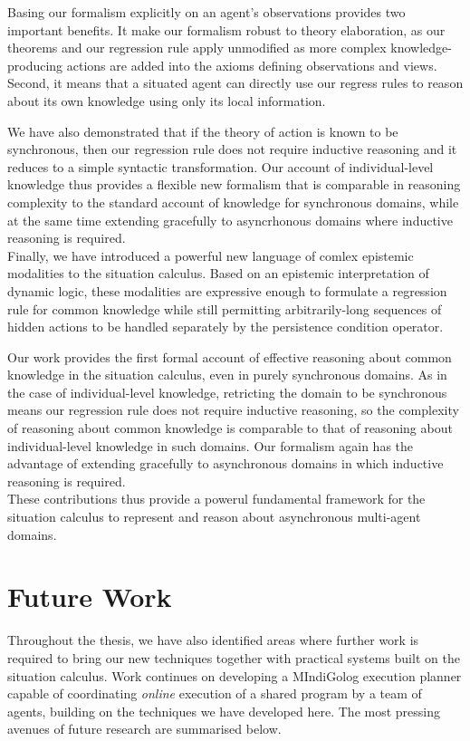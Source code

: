 Basing our formalism explicitly on an agent's observations provides
two important benefits. It make our formalism robust to theory elaboration,
as our theorems and our regression rule apply unmodified as more complex
knowledge-producing actions are added into the axioms defining observations
and views. Second, it means that a situated agent can directly use
our regress rules to reason about its own knowledge using only its
local information.

We have also demonstrated that if the theory of action is known to
be synchronous, then our regression rule does not require inductive
reasoning and it reduces to a simple syntactic transformation. Our
account of individual-level knowledge thus provides a flexible new
formalism that is comparable in reasoning complexity to the standard
account of knowledge for synchronous domains, while at the same time
extending gracefully to asyncrhonous domains where inductive reasoning
is required.\\


Finally, we have introduced a powerful new language of comlex epistemic
modalities to the situation calculus. Based on an epistemic interpretation
of dynamic logic, these modalities are expressive enough to formulate
a regression rule for common knowledge while still permitting arbitrarily-long
sequences of hidden actions to be handled separately by the persistence
condition operator.

Our work provides the first formal account of effective reasoning
about common knowledge in the situation calculus, even in  purely
synchronous domains. As in the case of individual-level knowledge,
retricting the domain to be synchronous means our regression rule
does not require inductive reasoning, so the complexity of reasoning
about common knowledge is comparable to that of reasoning about individual-level
knowledge in such domains. Our formalism again has the advantage of
extending gracefully to asynchronous domains in which inductive reasoning
is required.\\


These contributions thus provide a powerul fundamental framework for
the situation calculus to represent and reason about asynchronous
multi-agent domains.


\section{Future Work}

Throughout the thesis, we have also identified areas where further
work is required to bring our new techniques together with practical
systems built on the situation calculus. Work continues on developing
a MIndiGolog execution planner capable of coordinating \emph{online}
execution of a shared program by a team of agents, building on the
techniques we have developed here. The most pressing avenues of future
research are summarised below.

